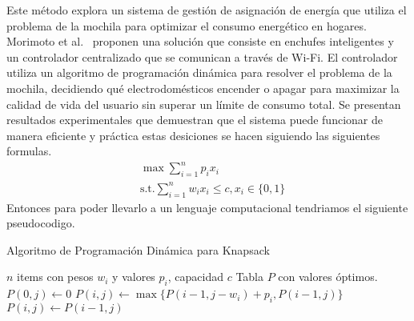 \documentclass[9pt,a4paper,twoside]{rho-class/rho}
\begin{document}
            Este método explora un sistema de gestión de asignación de energía que utiliza el problema de la mochila para optimizar el consumo energético en hogares.  Morimoto et al.~\cite{Morimoto2014} proponen una solución que consiste en enchufes inteligentes y un controlador centralizado que se comunican a través de Wi-Fi. El controlador utiliza un algoritmo de programación dinámica para resolver el problema de la mochila, decidiendo qué electrodomésticos encender o apagar para maximizar la calidad de vida del usuario sin superar un límite de consumo total. Se presentan resultados experimentales que demuestran que el sistema puede funcionar de manera eficiente y práctica estas desiciones se hacen siguiendo las siguientes formulas.
            \begin{align}
                &\max \sum_{i=1}^{n} p_ix_i \\
                &\text{s.t.} \sum_{i=1}^{n} w_ix_i \leq c, x_i \in \{0,1\}
            \end{align}
            Entonces para poder llevarlo a un lenguaje computacional tendriamos el siguiente pseudocodigo.
            \begin{algorithm}
            \caption{Algoritmo de Programación Dinámica para Knapsack}
            \begin{algorithmic}[1]
            \REQUIRE $n$ items con pesos $w_i$ y valores $p_i$, capacidad $c$
            \ENSURE Tabla $P$ con valores óptimos.
                \STATE $P(0,j) \gets 0$
            \ENDFOR
                        \STATE $P(i,j) \gets \max\{P(i-1,j-w_i) + p_i, P(i-1,j)\}$
                    \ELSE
                        \STATE $P(i,j) \gets P(i-1,j)$
                    \ENDIF
                \ENDFOR
            \ENDFOR
            \end{algorithmic}
            \end{algorithm}
\end{document}
